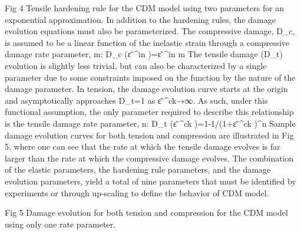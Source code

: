 Fig 4	Tensile hardening rule for the CDM model using two parameters for an exponential approximation.
In addition to the hardening rules, the damage evolution equations must also be parameterized. The compressive damage, D_c, is assumed to be a linear function of the inelastic strain through a compressive damage rate parameter, m:
	D_c (ε ̃^in )=ε ̃^in m		
The tensile damage (D_t) evolution is slightly less trivial, but can also be characterized by a single parameter due to some constraints imposed on the function by the nature of the damage parameter. In tension, the damage evolution curve starts at the origin and asymptotically approaches D_t=1 as ε ̃^ck→∞. As such, under this functional assumption, the only parameter required to describe this relationship is the tensile damage rate parameter, n:
	D_t (ε ̃^ck )=1-1/(1+ε ̃^ck )^n 		
Sample damage evolution curves for both tension and compression are illustrated in Fig 5, where one can see that the rate at which the tensile damage evolves is far larger than the rate at which the compressive damage evolves. 
The combination of the elastic parameters, the hardening rule parameters, and the damage evolution parameters, yield a total of nine parameters that must be identified by experiments or through up-scaling to define the behavior of CDM model. 
 
Fig 5	Damage evolution for both tension and compression for the CDM model using only one rate parameter.


